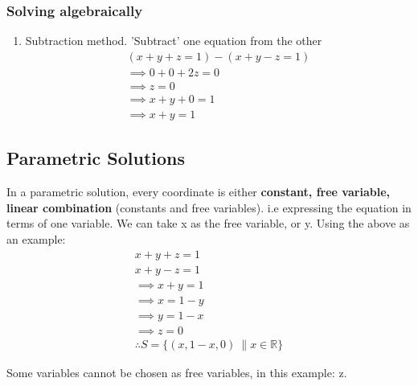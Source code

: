 \documentclass[11pt]{book}
\begin{document}
\subsubsection{Solving algebraically}
\begin{enumerate}
	\item{Subtraction method. 'Subtract' one equation from the other
		\begin{align*}
			(x+y+z=1) - (x+y-z=1)\\
			\implies 0 + 0 + 2z=0 \\
			\implies z=0 \\
			\implies x+y+0=1 \\
			\implies x+y=1
		\end{align*}
		}
\end{enumerate}
\subsection{Parametric Solutions}
\par{In a parametric solution, every coordinate is either \textbf{constant, free variable, linear combination }(constants and free variables). i.e expressing the equation in terms of one variable. We can take x as the free variable, or y. Using the above as an example:}
\begin{align*}
	x+y+z=1 \\ 
	x+y-z=1 \\
	\implies x+y=1 \\
	\implies x=1-y \\
	\implies y=1-x \\
	\implies z=0 \\
	\therefore S=\{\left(x, 1-x, 0\right)\ \|x\in \mathbb{R} \}
\end{align*}
\par{Some variables cannot be chosen as free variables, in this example: z.}
\end{document}

